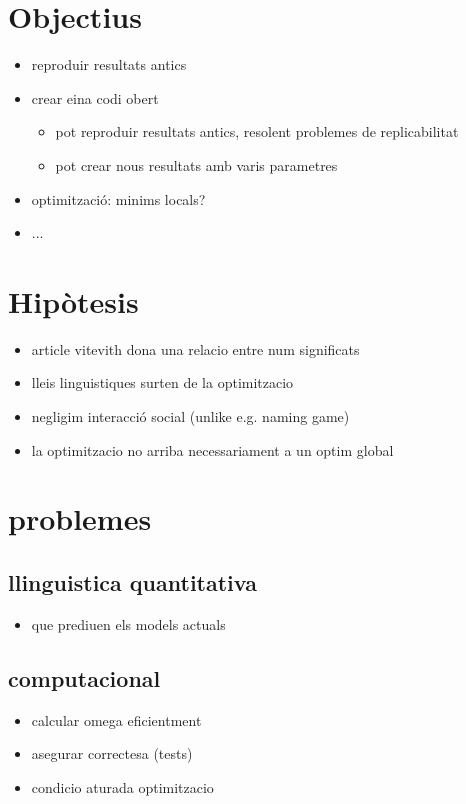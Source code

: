 \section{Objectius}
\begin{itemize}
\item reproduir resultats antics
\item crear eina codi obert
  \begin{itemize}
  \item pot reproduir resultats antics, resolent problemes de replicabilitat
  \item pot crear nous resultats amb varis parametres
  \end{itemize}
\item optimització: minims locals?
\item ...
\end{itemize}
\section{Hipòtesis}
\begin{itemize}
\item article vitevith dona una relacio entre num significats
\item lleis linguistiques surten de la optimitzacio
\item negligim interacció social (unlike e.g. naming game)
\item la optimitzacio no arriba necessariament a un optim global
\end{itemize}
\section{problemes}
\subsection{llinguistica quantitativa}
\begin{itemize}
\item que prediuen els models actuals
\end{itemize}
\subsection{computacional}
\begin{itemize}
\item calcular omega eficientment
\item asegurar correctesa (tests)
\item condicio aturada optimitzacio
\end{itemize}
